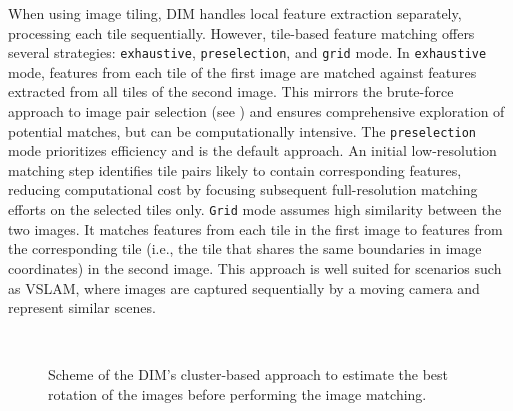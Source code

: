 When using image tiling, DIM handles local feature extraction separately, processing each tile sequentially. 
However, tile-based feature matching offers several strategies: \texttt{exhaustive}, \texttt{preselection}, and \texttt{grid} mode.
In \texttt{exhaustive} mode, features from each tile of the first image are matched against features extracted from all tiles of the second image. 
This mirrors the brute-force approach to image pair selection (see ) and ensures comprehensive exploration of potential matches, but can be computationally intensive. 
The \texttt{preselection} mode prioritizes efficiency and is the default approach. 
An initial low-resolution matching step identifies tile pairs likely to contain corresponding features, reducing computational cost by focusing subsequent full-resolution matching efforts on the selected tiles only. 
\texttt{Grid} mode assumes high similarity between the two images. 
It matches features from each tile in the first image to features from the corresponding tile (i.e., the tile that shares the same boundaries in image coordinates) in the second image. 
This approach is well suited for scenarios such as VSLAM, where images are captured sequentially by a moving camera and represent similar scenes. 

\begin{figure}[hb!]
  \centering
   \\
  \caption{Scheme of the DIM's cluster-based approach to estimate the best rotation of the images before performing the image matching.}
  \label{fig:5:dim_rotations}
\end{figure}

